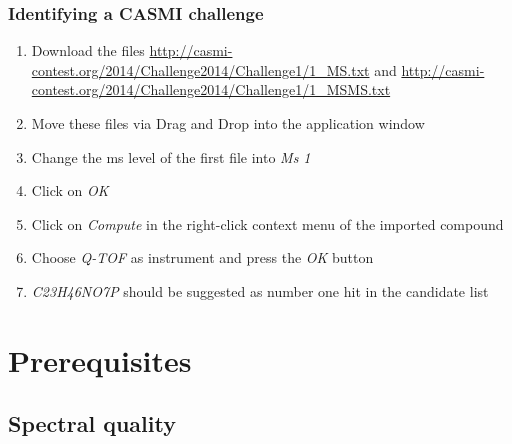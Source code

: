 \documentclass[letterpaper,10pt,openany,oneside]{sphinxmanual}
\begin{document}
\subsection{Identifying a CASMI challenge}
\label{gui:identifying-a-casmi-challenge}\begin{enumerate}
\item {} 
Download the files \url{http://casmi-contest.org/2014/Challenge2014/Challenge1/1\_MS.txt} and \url{http://casmi-contest.org/2014/Challenge2014/Challenge1/1\_MSMS.txt}

\item {} 
Move these files via Drag and Drop into the application window

\item {} 
Change the ms level of the first file into \emph{Ms 1}

\item {} 
Click on \emph{OK}

\item {} 
Click on \emph{Compute} in the right-click context menu of the imported compound

\item {} 
Choose \emph{Q-TOF} as instrument and press the \emph{OK} button

\item {} 
\emph{C23H46NO7P} should be suggested as number one hit in the candidate list

\end{enumerate}
  

\chapter{Prerequisites}\label{gui::prerequisites}

\section{Spectral quality}
\end{document}
